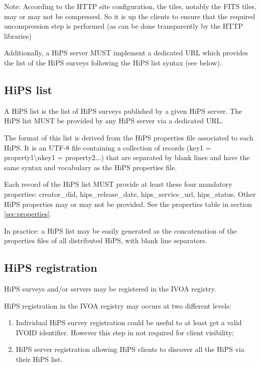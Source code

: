 \documentclass[11pt,a4paper]{ivoa}
\begin{document}
Note: According to the HTTP site configuration, the tiles, notably the FITS tiles, may or may not be compressed. So it is up the clients to ensure that the required uncompression step is performed (as can be done transparently by the HTTP libraries)

Additionally, a HiPS server MUST implement a dedicated URL which provides the list of the HiPS surveys following the HiPS list syntax (see below).

\subsection{HiPS list}

A HiPS list is the list of HiPS surveys published by a given HiPS server. The HiPS list MUST be provided by any HiPS server via a dedicated URL.

The format of this list is derived from the HiPS properties file associated to each HiPS. It is an UTF-8 file containing a collection of records (key1 = property1\textbackslash nkey1 = property2...) that are separated by blank lines and have the same syntax and vocabulary as the HiPS properties file. 

Each record of the HiPS list MUST provide at least these four mandatory properties: creator\_did, hips\_release\_date, hips\_service\_url, hips\_status. Other HiPS properties may or may not be provided. See the properties table in section \ref{sec:properties}. 

In practice: a HiPS list may be easily generated as the concatenation of the properties files of all distributed HiPS, with blank line separators.

\subsection{HiPS registration}
\label{sec:registration}

HiPS surveys and/or servers may be registered in the IVOA registry. 

HiPS registration in the IVOA registry may occurs at two different levels:
\begin{enumerate}
\item Individual HiPS survey registration could be useful to at least get a valid IVOID identifier. However this step in not required for client visibility;
\item HiPS server registration allowing HiPS clients to discover all the HiPS via their HiPS list.
\end{enumerate}
\end{document}
